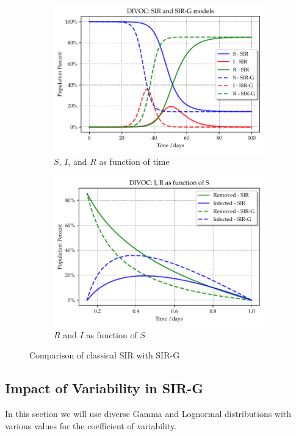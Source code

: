 \documentclass[twoside,USenglish,10pt]{article}
\begin{document}
\begin{figure}
	\centering
	\begin{subfigure}{.45\textwidth}
		\includegraphics[width=.8\linewidth]{DIVOC-SIR-comp.pdf}
		\caption{$S$, $I$, and $R$ as function of time}
	\end{subfigure}	
	\begin{subfigure}{.45\textwidth}
		\includegraphics[width=.8\linewidth]{DIVOC-IR-comp.pdf}
		\caption{$R$ and $I$ as function of $S$}
	\end{subfigure}	
	\caption{Comparison of classical SIR with SIR-G}
	\label{fig:comp}
\end{figure}


\subsection{Impact of Variability in SIR-G}

In this section we will use diverse Gamma and Lognormal distributions with various values for the coefficient of variability.
\end{document}
